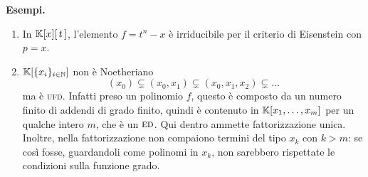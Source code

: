 \begin{multicols}{2}
\textbf{Esempi.}
\begin{enumerate}
	\item  In $ \mathbb{K}[x][\,t\,] $, l'elemento $ f = t^n - x $ è irriducibile per il criterio di Eisenstein con $ p = x $. 
	\item $ \mathbb{K}[\{x_i\}_{i \in \mathbb{N}}] $ non è Noetheriano
	\[ (x_0) \subsetneq (x_0, x_1) \subsetneq (x_0, x_1, x_2) \subsetneq \dots  \]
	ma è \textsc{ufd}. Infatti preso un polinomio $ f $, questo è composto da un numero finito di addendi di grado finito, quindi è contenuto in $ \mathbb{K}[x_1, \dots, x_m] $ per un qualche intero $ m $, che è un $ \textsc{ed} $. Qui dentro ammette fattorizzazione unica. Inoltre, nella fattorizzazione non compaiono termini del tipo $ x_k $ con $ k > m $: se così fosse, guardandoli come polinomi in $ x_k $, non sarebbero rispettate le condizioni sulla funzione grado.
\end{enumerate}


\end{multicols}







